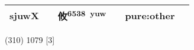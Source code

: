 \documentclass[14pt,a4paper]{scrartcl}
\begin{document}
\begin{longtable}[c]{@{}llllll@{}}
\begin{minipage}[t]{0.14\columnwidth}
sjuwX
\strut\end{minipage} &
\begin{minipage}[t]{0.14\columnwidth}\raggedright\strut
\strut\end{minipage} &
\begin{minipage}[t]{0.14\columnwidth}\raggedright\strut
攸\textsuperscript{6538~yuw}
\strut\end{minipage} &
\begin{minipage}[t]{0.14\columnwidth}\raggedright\strut
\strut\end{minipage} &
\begin{minipage}[t]{0.14\columnwidth}\raggedright\strut
pure:other
\strut\end{minipage}\tabularnewline
\bottomrule
\end{longtable}

(310) 1079 {[}3{]}
\end{document}

